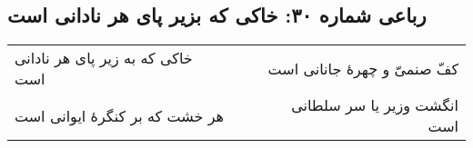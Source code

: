 \begin{center}
\section*{رباعی شماره ۳۰: خاکی که بزیر پای هر نادانی است}
\label{sec:sh030}
\begin{longtable}{l p{0.5cm} r}
خاکی که به زیر پای هر نادانی است
&&
کفّ صنمیّ و چهرهٔ جانانی است
\\
هر خشت که بر کنگرهٔ ایوانی است
&&
انگشت وزیر یا سر سلطانی است
\\
\end{longtable}
\end{center}
